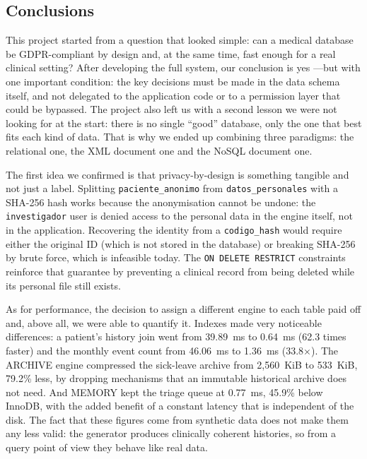 \documentclass[../main.tex]{subfiles}
\begin{document}
\subsection{Conclusions}

This project started from a question that looked simple: can a medical database be GDPR-compliant by design and, at the same time, fast enough for a real clinical setting? After developing the full system, our conclusion is yes ---but with one important condition: the key decisions must be made in the data schema itself, and not delegated to the application code or to a permission layer that could be bypassed. The project also left us with a second lesson we were not looking for at the start: there is no single \enquote{good} database, only the one that best fits each kind of data. That is why we ended up combining three paradigms: the relational one, the XML document one and the NoSQL document one.

The first idea we confirmed is that privacy-by-design is something tangible and not just a label. Splitting \texttt{paciente\_anonimo} from \texttt{datos\_personales} with a SHA-256 hash works because the anonymisation cannot be undone: the \texttt{investigador} user is denied access to the personal data in the engine itself, not in the application. Recovering the identity from a \texttt{codigo\_hash} would require either the original ID (which is not stored in the database) or breaking SHA-256 by brute force, which is infeasible today. The \texttt{ON DELETE RESTRICT} constraints reinforce that guarantee by preventing a clinical record from being deleted while its personal file still exists.

As for performance, the decision to assign a different engine to each table paid off and, above all, we were able to quantify it. Indexes made very noticeable differences: a patient's history join went from 39.89~ms to 0.64~ms (62.3 times faster) and the monthly event count from 46.06~ms to 1.36~ms (33.8×). The ARCHIVE engine compressed the sick-leave archive from 2,560~KiB to 533~KiB, 79.2\% less, by dropping mechanisms that an immutable historical archive does not need. And MEMORY kept the triage queue at 0.77~ms, 45.9\% below InnoDB, with the added benefit of a constant latency that is independent of the disk. The fact that these figures come from synthetic data does not make them any less valid: the generator produces clinically coherent histories, so from a query point of view they behave like real data.
\end{document}
